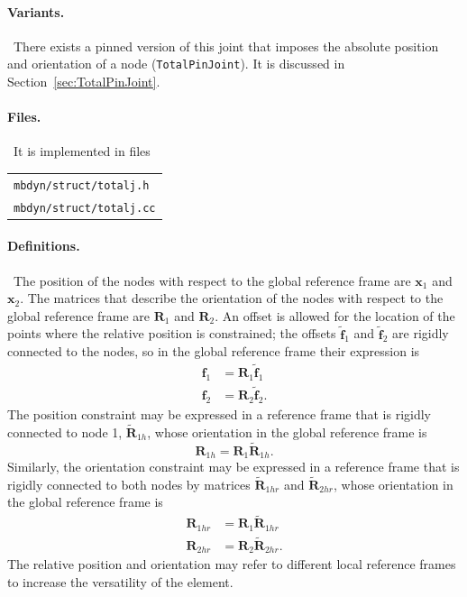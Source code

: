 \documentclass[10pt,fleqn,subeqn]{report}
\newcommand{\T}[1]{\bm{#1}}
\begin{document}
\paragraph{Variants.} \
There exists a pinned version of this joint that imposes 
the absolute position and orientation of a node (\texttt{TotalPinJoint}).
It is discussed in Section~\ref{sec:TotalPinJoint}.


\paragraph{Files.} \
It is implemented in files\\
\begin{tabular}{l}
\texttt{mbdyn/struct/totalj.h} \\
\texttt{mbdyn/struct/totalj.cc}
\end{tabular}

\paragraph{Definitions.} \
The position of the nodes with respect to the global reference frame
are $\T{x}_1$ and $\T{x}_2$.
The matrices that describe the orientation of the nodes
with respect to the global reference frame
are $\T{R}_1$ and $\T{R}_2$.
An offset is allowed for the location of the points where 
the relative position is constrained; the offsets $\tilde{\T{f}}_1$
and $\tilde{\T{f}}_2$ are rigidly connected to the nodes,
so in the global reference frame their expression is
\begin{subequations}
\begin{align}
	\T{f}_1 &= \T{R}_1 \tilde{\T{f}}_1 \\
	\T{f}_2 &= \T{R}_2 \tilde{\T{f}}_2 .
\end{align}
\end{subequations}
The position constraint may be expressed in a reference frame 
that is rigidly connected to node 1, $\tilde{\T{R}}_{1h}$, whose orientation
in the global reference frame is
\begin{equation}
	\T{R}_{1h} = \T{R}_1 \tilde{\T{R}}_{1h} .
\end{equation}
Similarly, the orientation constraint may be expressed in a reference
frame that is rigidly connected to both nodes by matrices
$\tilde{\T{R}}_{1hr}$ and $\tilde{\T{R}}_{2hr}$, whose orientation
in the global reference frame is
\begin{subequations}
\begin{align}
	\T{R}_{1hr} &= \T{R}_1 \tilde{\T{R}}_{1hr} \\
	\T{R}_{2hr} &= \T{R}_2 \tilde{\T{R}}_{2hr} .
\end{align}
\end{subequations}
The relative position and orientation may refer to different
local reference frames to increase the versatility of the element.
\end{document}
